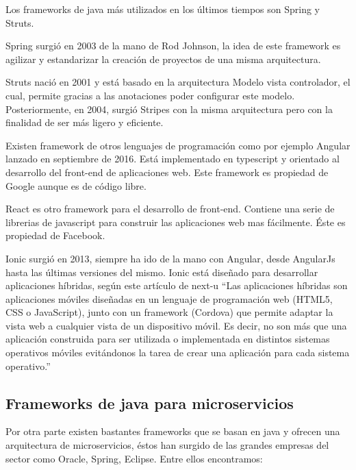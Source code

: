 \documentclass[12pt]{report} %
\begin{document}
 Los frameworks de java más utilizados en los últimos tiempos son Spring y Struts.
 
 Spring surgió en 2003 de la mano de Rod Johnson, la idea de este framework es agilizar y estandarizar la creación de proyectos de una misma arquitectura. 
 
 Struts nació en 2001 y está basado en la arquitectura Modelo vista controlador, el cual, permite gracias a las anotaciones poder configurar este modelo. Posteriormente, en 2004, surgió Stripes con la misma arquitectura pero con la finalidad de ser más ligero y eficiente.
 
 Existen framework de otros lenguajes de programación como por ejemplo Angular lanzado en septiembre de 2016. Está implementado en typescript y orientado al desarrollo del front-end de aplicaciones web. Este framework es propiedad de Google aunque es de código libre.
 
 React es otro framework para el desarrollo de front-end. Contiene una serie de librerias de javascript para construir las aplicaciones web mas fácilmente. Éste es propiedad de Facebook.
 
 Ionic surgió en 2013, siempre ha ido de la mano con Angular, desde AngularJs hasta las últimas versiones del mismo. Ionic está diseñado para desarrollar aplicaciones híbridas, según este artículo de next-u \cite{AppHibridas} “Las aplicaciones híbridas son aplicaciones móviles diseñadas en un lenguaje de programación web (HTML5, CSS o JavaScript), junto con un framework (Cordova) que permite adaptar la vista web a cualquier vista de un dispositivo móvil. Es decir, no son más que una aplicación construida para ser utilizada o implementada en distintos sistemas operativos móviles evitándonos la tarea de crear una aplicación para cada sistema operativo.”
 
 \subsection{Frameworks de java para microservicios}
 Por otra parte existen bastantes frameworks que se basan en java y ofrecen una arquitectura de microservicios, éstos han surgido de las grandes empresas del sector como Oracle, Spring, Eclipse. Entre ellos encontramos:
\end{document}
